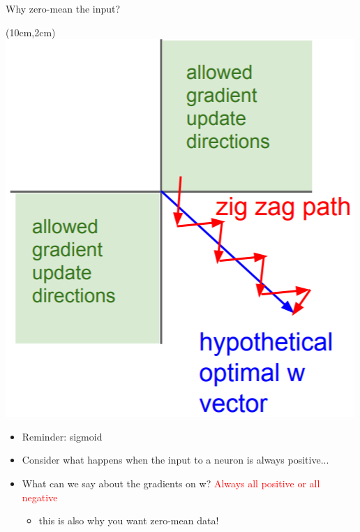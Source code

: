 \documentclass[serif, aspectratio=169]{beamer}
\begin{document}
\begin{frame}{Why zero-mean the input?}

	\begin{textblock*}{5cm}(10cm,2cm) %
		\includegraphics[keepaspectratio, scale=0.3]{pic/zigzag}
	\end{textblock*}

	\begin{itemize}
		\item Reminder: sigmoid
		\item Consider what happens when the input \newline to a neuron is always positive...
		\item What can we say about the gradients on w? \newline \textcolor{red}{Always all positive or all negative}
		\begin{itemize}
			\item this is also why you want zero-mean data!
		\end{itemize}
	\end{itemize}
	
\end{frame}
\end{document}
